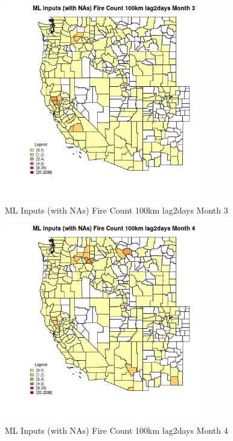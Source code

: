 \begin{figure} 
\centering  
\includegraphics[width=0.77\textwidth]{Code_Outputs/Report_ML_input_PM25_Step4_part_e_de_duplicated_aves_compiled_2019-05-20wNAs_CountyFire_Count_100km_lag2daysmedianMonth3.jpg} 
\caption{\label{fig:Report_ML_input_PM25_Step4_part_e_de_duplicated_aves_compiled_2019-05-20wNAsCountyFire_Count_100km_lag2daysmedianMonth3}ML Inputs (with NAs) Fire Count 100km lag2days Month 3} 
\end{figure} 
 

\begin{figure} 
\centering  
\includegraphics[width=0.77\textwidth]{Code_Outputs/Report_ML_input_PM25_Step4_part_e_de_duplicated_aves_compiled_2019-05-20wNAs_CountyFire_Count_100km_lag2daysmedianMonth4.jpg} 
\caption{\label{fig:Report_ML_input_PM25_Step4_part_e_de_duplicated_aves_compiled_2019-05-20wNAsCountyFire_Count_100km_lag2daysmedianMonth4}ML Inputs (with NAs) Fire Count 100km lag2days Month 4} 
\end{figure} 
 

